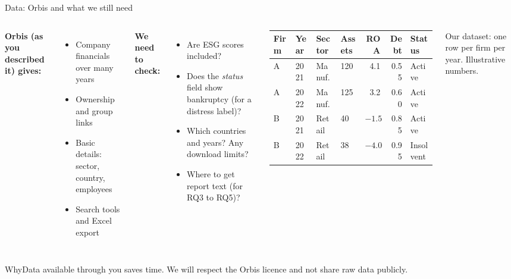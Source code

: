 \documentclass[aspectratio=169,11pt]{beamer}
\newcommand{\why}[1]{\vspace{2pt}\begin{block}{Why}#1\end{block}}
\begin{document}
\begin{frame}[t]{Data: Orbis and what we still need}
\begin{columns}[T]
\footnotesize
\textbf{Orbis (as you described it) gives:}
\begin{itemize}
\setlength{\itemsep}{1pt}
\item Company financials over many years
\item Ownership and group links
\item Basic details: sector, country, employees
\item Search tools and Excel export
\end{itemize}
\textbf{We need to check:}
\begin{itemize}
\setlength{\itemsep}{1pt}
\item Are ESG scores included?
\item Does the \emph{status} field show bankruptcy (for a distress label)?
\item Which countries and years? Any download limits?
\item Where to get report text (for RQ3 to RQ5)?
\end{itemize}
\centering\scriptsize
\setlength{\tabcolsep}{2.5pt}
\vspace{4pt}
\begin{tabular}{llllrrl}
\toprule
\rowcolor{softteal} Firm & Year & Sector & Assets & ROA & Debt & Status \\
\midrule
A & 2021 & Manuf. & 120 & 4.1 & 0.55 & Active \\
A & 2022 & Manuf. & 125 & 3.2 & 0.60 & Active \\
B & 2021 & Retail & 40 & $-1.5$ & 0.85 & Active \\
B & 2022 & Retail & 38 & $-4.0$ & 0.95 & Insolvent \\
\bottomrule
\end{tabular}

{\tiny\color{navy!60}Our dataset: one row per firm per year. Illustrative numbers.}
\end{columns}
\why{Data available through you saves time. We will respect the Orbis licence and not share raw data publicly.}
\end{frame}
\end{document}
